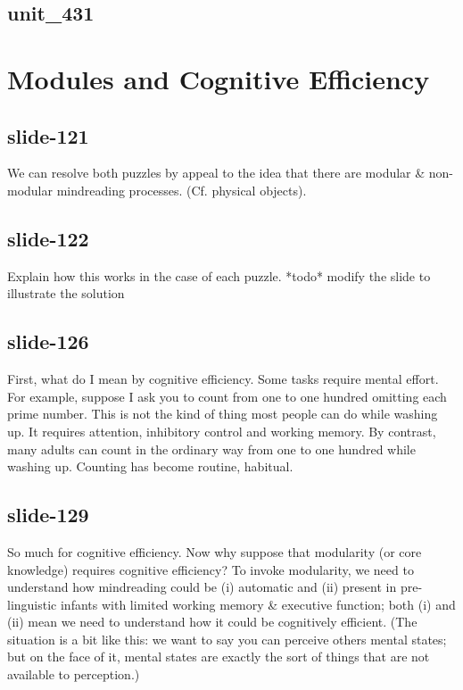 \documentclass[12pt,\papersize]{extarticle}
\begin{document}
 
\subsection{unit\_431}
 
\section{Modules and Cognitive Efficiency}
 
 
\subsection{slide-121}
We can resolve both puzzles by appeal to the idea that there are modular \& non-modular mindreading processes. (Cf. physical objects).
 
 
\subsection{slide-122}
Explain how this works in the case of each puzzle.
*todo* modify the slide to illustrate the solution
 
 
\subsection{slide-126}
First, what do I mean by cognitive efficiency.
Some tasks require mental effort.
For example, suppose I ask you to count from one to one hundred omitting each prime number.
This is not the kind of thing most people can do while washing up.
It requires attention, inhibitory control and working memory.
By contrast, many adults can count in the ordinary way from one to one hundred while washing up.
Counting has become routine, habitual.
 
 
\subsection{slide-129}
So much for cognitive efficiency.
Now why suppose that modularity (or core knowledge) requires cognitive efficiency?
To invoke modularity, we need to understand how mindreading could be (i) automatic and (ii) present in pre-linguistic infants with limited working memory \& executive function; both (i) and (ii) mean we need to understand how it could be cognitively efficient. (The situation is a bit like this: we want to say you can perceive others mental states; but on the face of it, mental states are exactly the sort of things that are not available to perception.)
 
\end{document}
